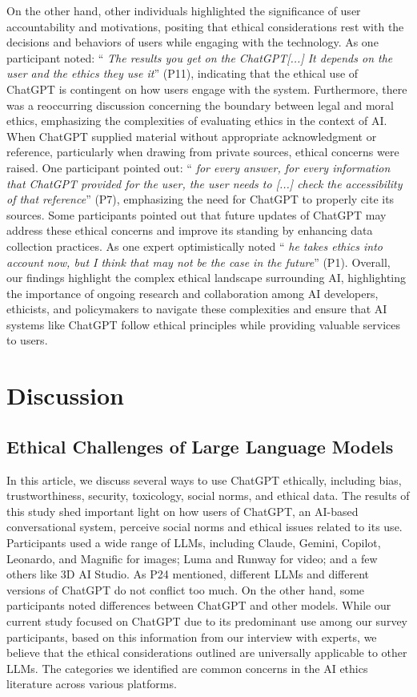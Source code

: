 \documentclass[sigconf]{acmart}
\begin{document}
On the other hand, other individuals highlighted the significance of user accountability and motivations, positing that ethical considerations rest with the decisions and behaviors of users while engaging with the technology. As one participant noted: \enquote { \emph {The results you get on the ChatGPT[...] It depends on the user and the ethics they use it}} (P11), indicating that the ethical use of ChatGPT is contingent on how users engage with the system. Furthermore, there was a reoccurring discussion concerning the boundary between legal and moral ethics, emphasizing the complexities of evaluating ethics in the context of AI. When ChatGPT supplied material without appropriate acknowledgment or reference, particularly when drawing from private sources, ethical concerns were raised. One participant pointed out: \enquote { \emph {for every answer, for every information that ChatGPT provided for the user, the user needs to [...] check the accessibility of that reference}} (P7), emphasizing the need for ChatGPT to properly cite its sources. Some participants pointed out that future updates of ChatGPT may address these ethical concerns and improve its standing by enhancing data collection practices. As one expert optimistically noted \enquote { \emph {he takes ethics into account now, but I think that may not be the case in the future}} (P1). Overall, our findings highlight the complex ethical landscape surrounding AI, highlighting the importance of ongoing research and collaboration among AI developers, ethicists, and policymakers to navigate these complexities and ensure that AI systems like ChatGPT follow ethical principles while providing valuable services to users.



\section{Discussion}

\subsection{Ethical Challenges of Large Language Models }

In this article, we discuss several ways to use ChatGPT ethically, including bias, trustworthiness, security, toxicology, social norms, and ethical data. The results of this study shed important light on how users of ChatGPT, an AI-based conversational system, perceive social norms and ethical issues related to its use. Participants used a wide range of LLMs, including Claude, Gemini, Copilot, Leonardo, and Magnific for images; Luma and Runway for video; and a few others like 3D AI Studio. As P24 mentioned, different LLMs and different versions of ChatGPT do not conflict too much. On the other hand, some participants noted differences between ChatGPT and other models. While our current study focused on ChatGPT due to its predominant use among our survey participants, based on this information from our interview with experts, we believe that the ethical considerations outlined are universally applicable to other LLMs. The categories we identified are common concerns in the AI ethics literature across various platforms.
\end{document}
